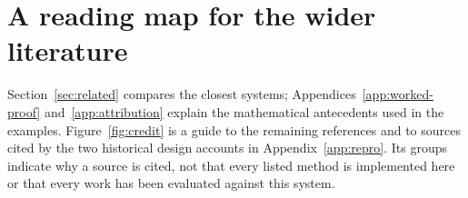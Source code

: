 \documentclass[10pt]{article}
\begin{document}
\clearpage
\section{A reading map for the wider literature}\label{app:source-map}

Section~\ref{sec:related} compares the closest systems; Appendices~\ref{app:worked-proof} and~\ref{app:attribution} explain the mathematical antecedents used in the examples. Figure~\ref{fig:credit} is a guide to the remaining references and to sources cited by the two historical design accounts in Appendix~\ref{app:repro}. Its groups indicate why a source is cited, not that every listed method is implemented here or that every work has been evaluated against this system.
\end{document}
